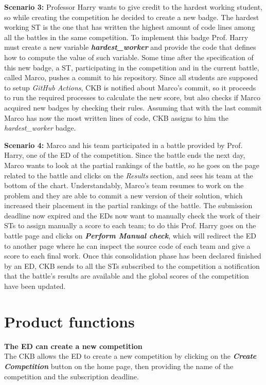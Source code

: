 \textbf{Scenario 3:} Professor Harry wants to give credit to the hardest working student, so while creating the competition he decided to create a new badge. The hardest working ST is the one that has written the highest amount of code lines among all the battles in the same competition. To implement this badge Prof. Harry must create a new variable \textbf{\textit{hardest\_worker}} and provide the code that defines how to compute the value of such variable. Some time after the specification of this new badge, a ST, participating in the competition and in the current battle, called Marco, pushes a commit to his repository. Since all students are supposed to setup \textit{GitHub Actions}, CKB is notified about Marco's commit, so it proceeds to run the required processes to calculate the new score, but also checks if Marco acquired new badges by checking their rules. Assuming that with the last commit Marco has now the most written lines of code, CKB assigns to him the \textit{hardest\_worker} badge.


\textbf{Scenario 4:} Marco and his team participated in a battle provided by Prof. Harry, one of the ED of the competition. Since the battle ends the next day, Marco wants to look at the partial rankings of the battle, so he goes on the page related to the battle and clicks on the \textit{Results} section, and sees his team at the bottom of the chart. Understandably, Marco's team resumes to work on the problem and they are able to commit a new version of their solution, which increased their placement in the partial rankings of the battle. The submission deadline now expired and the EDs now want to manually check the work of their STs to assign manually a score to each team; to do this Prof. Harry goes on the battle page and clicks on \textbf{\textit{Perform Manual check}}, which will redirect the ED to another page where he can inspect the source code of each team and give a score to each final work. Once this consolidation phase has been declared finished by an ED, CKB sends to all the STs subscribed to the competition a notification that the battle's results are available and the global scores of the competition have been updated.


\section{Product functions}
\label{s:Product_functions}%

\textbf{The ED can create a new competition} \\
The CKB allows the ED to create a new competition by clicking on the \textbf{\textit{Create Competition}} button on the home page, then providing the name of the competition and the subscription deadline.


